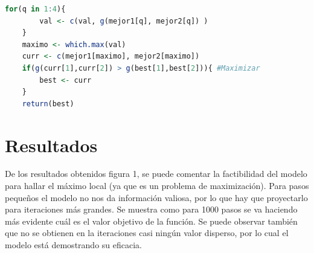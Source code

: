 \documentclass{article}
\begin{document}
\begin{lstlisting}[language=R]
	for(q in 1:4){
		val <- c(val, g(mejor1[q], mejor2[q]) )
	}
	maximo <- which.max(val)
	curr <- c(mejor1[maximo], mejor2[maximo])
	if(g(curr[1],curr[2]) > g(best[1],best[2])){ #Maximizar
		best <- curr
	}
	return(best)
\end{lstlisting}

\section{Resultados}
De los resultados obtenidos figura 1, se puede comentar la factibilidad del modelo para hallar el máximo local (ya que es un problema de maximización). Para pasos pequeños el modelo no nos da información valiosa, por lo que hay que proyectarlo para iteraciones más grandes. Se muestra como para 1000 pasos se va haciendo más evidente cuál es el valor objetivo de la función. Se puede observar también que no se obtienen en la iteraciones casi ningún valor disperso, por lo cual el modelo está demostrando su eficacia.   
\end{document}
